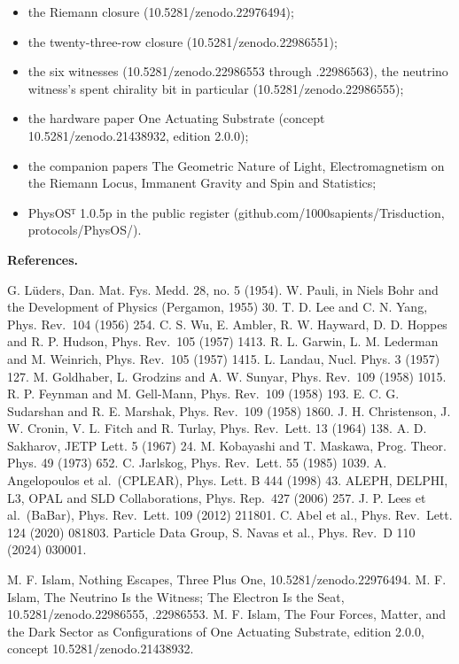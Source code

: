 \documentclass[10pt]{article}
\providecommand{\tightlist}{\setlength{\itemsep}{0pt}\setlength{\parskip}{0pt}}
\begin{document}
\begin{itemize}
\tightlist
\item
  the Riemann closure (10.5281/\allowbreak{}zenodo.22976494);
\item
  the twenty-three-row closure (10.5281/\allowbreak{}zenodo.22986551);
\item
  the six witnesses (10.5281/\allowbreak{}zenodo.22986553 through
  .22986563), the neutrino witness's spent chirality bit in particular
  (10.5281/\allowbreak{}zenodo.22986555);
\item
  the hardware paper One Actuating Substrate (concept
  10.5281/\allowbreak{}zenodo.21438932, edition 2.0.0);
\item
  the companion papers The Geometric Nature of Light, Electromagnetism
  on the Riemann Locus, Immanent Gravity and Spin and Statistics;
\item
  PhysOSᵀ 1.0.5p in the public register
  (github.com/\allowbreak{}1000sapients/\allowbreak{}Trisduction,
  protocols/PhysOS/).
\end{itemize}

\textbf{References.}

G. Lüders, Dan. Mat. Fys. Medd. 28, no. 5 (1954). W. Pauli, in Niels
Bohr and the Development of Physics (Pergamon, 1955) 30. T. D. Lee and
C. N. Yang, Phys. Rev.~104 (1956) 254. C. S. Wu, E. Ambler, R. W.
Hayward, D. D. Hoppes and R. P. Hudson, Phys. Rev.~105 (1957) 1413. R.
L. Garwin, L. M. Lederman and M. Weinrich, Phys. Rev.~105 (1957) 1415.
L. Landau, Nucl. Phys. 3 (1957) 127. M. Goldhaber, L. Grodzins and A. W.
Sunyar, Phys. Rev.~109 (1958) 1015. R. P. Feynman and M. Gell-Mann,
Phys. Rev.~109 (1958) 193. E. C. G. Sudarshan and R. E. Marshak, Phys.
Rev.~109 (1958) 1860. J. H. Christenson, J. W. Cronin, V. L. Fitch and
R. Turlay, Phys. Rev.~Lett. 13 (1964) 138. A. D. Sakharov, JETP Lett. 5
(1967) 24. M. Kobayashi and T. Maskawa, Prog. Theor. Phys. 49 (1973)
652. C. Jarlskog, Phys. Rev.~Lett. 55 (1985) 1039. A. Angelopoulos et
al.~(CPLEAR), Phys. Lett. B 444 (1998) 43. ALEPH, DELPHI, L3, OPAL and
SLD Collaborations, Phys. Rep.~427 (2006) 257. J. P. Lees et
al.~(BaBar), Phys. Rev.~Lett. 109 (2012) 211801. C. Abel et al., Phys.
Rev.~Lett. 124 (2020) 081803. Particle Data Group, S. Navas et al.,
Phys. Rev.~D 110 (2024) 030001.

M. F. Islam, Nothing Escapes, Three Plus One,
10.5281/\allowbreak{}zenodo.22976494. M. F. Islam, The Neutrino Is the
Witness; The Electron Is the Seat, 10.5281/\allowbreak{}zenodo.22986555,
.22986553. M. F. Islam, The Four Forces, Matter, and the Dark Sector as
Configurations of One Actuating Substrate, edition 2.0.0, concept
10.5281/\allowbreak{}zenodo.21438932.
\end{document}

